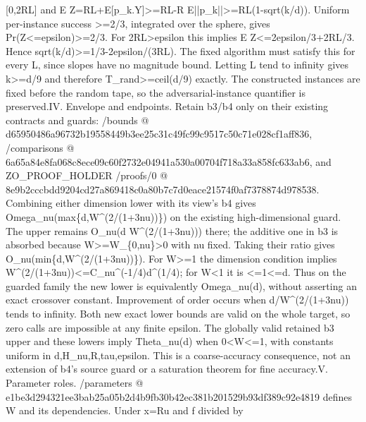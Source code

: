 \documentclass[10pt,a4paper]{article}
\begin{document}
[0,\allowbreak{}2RL] and E Z=\allowbreak{}RL+E[p\_\allowbreak{}k.Y]>=\allowbreak{}RL-R E||p\_\allowbreak{}k||>=\allowbreak{}RL(1-sqrt(k/\allowbreak{}d)). Uniform per-instance success >=\allowbreak{}2/\allowbreak{}3,\allowbreak{} integrated over the sphere,\allowbreak{} gives Pr(Z<=\allowbreak{}epsilon)>=\allowbreak{}2/\allowbreak{}3. For 2RL>epsilon this implies E Z<=\allowbreak{}2epsilon/\allowbreak{}3+2RL/\allowbreak{}3. Hence sqrt(k/\allowbreak{}d)>=\allowbreak{}1/\allowbreak{}3-2epsilon/\allowbreak{}(3RL). The fixed algorithm must satisfy this for every L,\allowbreak{} since slopes have no magnitude bound. Letting L tend to infinity gives k>=\allowbreak{}d/\allowbreak{}9 and therefore T\_\allowbreak{}rand>=\allowbreak{}ceil(d/\allowbreak{}9) exactly. The constructed instances are fixed before the random tape,\allowbreak{} so the adversarial-instance quantifier is preserved.\newline{}\newline{}IV. Envelope and endpoints. Retain b3/\allowbreak{}b4 only on their existing contracts and guards:\allowbreak{} /\allowbreak{}bounds @ d65950486a96732b19558449b3ee25c31c49fc99c9517c50c71e028cf1aff836,\allowbreak{} /\allowbreak{}comparisons @ 6a65a84e8fa068c8ece09c60f2732e04941a530a00704f718a33a858fc633ab6,\allowbreak{} and ZO\_\allowbreak{}PROOF\_\allowbreak{}HOLDER /\allowbreak{}proofs/\allowbreak{}0 @ 8e9b2cccbdd9204cd27a869418c0a80b7c7d0eace21574f0af7378874d978538. Combining either dimension lower with its view's b4 gives Omega\_\allowbreak{}nu(max\{d,\allowbreak{}W\textasciicircum{}(2/\allowbreak{}(1+3nu))\}) on the existing high-dimensional guard. The upper remains O\_\allowbreak{}nu(d W\textasciicircum{}(2/\allowbreak{}(1+3nu))) there;\allowbreak{} the additive one in b3 is absorbed because W>=\allowbreak{}W\_\allowbreak{}\{0,\allowbreak{}nu\}>0 with nu fixed. Taking their ratio gives O\_\allowbreak{}nu(min\{d,\allowbreak{}W\textasciicircum{}(2/\allowbreak{}(1+3nu))\}). For W>=\allowbreak{}1 the dimension condition implies W\textasciicircum{}(2/\allowbreak{}(1+3nu))<=\allowbreak{}C\_\allowbreak{}nu\textasciicircum{}(-1/\allowbreak{}4)d\textasciicircum{}(1/\allowbreak{}4);\allowbreak{} for W<1 it is <=\allowbreak{}1<=\allowbreak{}d. Thus on the guarded family the new lower is equivalently Omega\_\allowbreak{}nu(d),\allowbreak{} without asserting an exact crossover constant. Improvement of order occurs when d/\allowbreak{}W\textasciicircum{}(2/\allowbreak{}(1+3nu)) tends to infinity. Both new exact lower bounds are valid on the whole target,\allowbreak{} so zero calls are impossible at any finite epsilon. The globally valid retained b3 upper and these lowers imply Theta\_\allowbreak{}nu(d) when 0<W<=\allowbreak{}1,\allowbreak{} with constants uniform in d,\allowbreak{}H\_\allowbreak{}nu,\allowbreak{}R,\allowbreak{}tau,\allowbreak{}epsilon. This is a coarse-accuracy consequence,\allowbreak{} not an extension of b4's source guard or a saturation theorem for fine accuracy.\newline{}\newline{}V. Parameter roles. /\allowbreak{}parameters @ e1be3d294321ee3bab25a05b2d4b9fb30b42ec381b201529b93df389c92e4819 defines W and its dependencies. Under x=\allowbreak{}Ru and f divided by 
\end{document}
